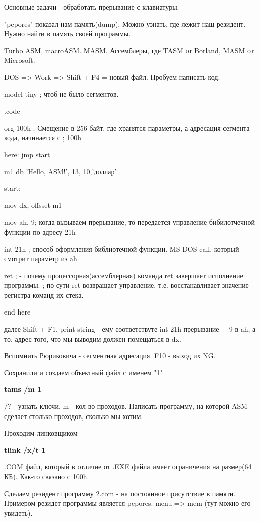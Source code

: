 Основные задачи - обработать прерывание с клавиатуры.   
 
"pepores" показал нам память(dump). Можно узнать, где лежит наш резидент. Нужно найти в память своей программы. 

Turbo ASM, macroASM. MASM. Ассемблеры, где TASM от Borland, MASM от Microsoft. 

DOS => Work => Shift + F4 = новый файл. Пробуем написать код.

model tiny ; чтоб не было сегментов.

.code
\begin{hw} 
org 100h ; Смещение в 256 байт, где хранятся параметры, а адресация сегмента кода, начинается с
		 ; 100h 
\end{hw}
here:
jmp start

m1 db 'Hello, ASM!', 13, 10,'доллар'

start: 

mov dx, offsset m1

mov ah, 9; когда вызываем прерывание, то передается управление бибилотчечной функции по адресу 21h

int 21h ; способ оформления библиотечной функции. MS-DOS call, который смотрит параметр из ah

ret 	; - почему процессорная(ассемблерная) команда ret завершает исполнение программы.
		; по сути ret возвращает управление, т.е. восстанавливает значение регистра команд их стека.

end here    

далее Shift + F1, print string - ему соответствуте int 21h прерывание + 9 в ah, а то, адрес того, что мы выводим должен помещаться в dx.

Вспомнить Рюриковича - сегментная адресация. F10 - выход их NG.

Сохранили и создаем объектный файл с именем "1"

\bfseries tams /m 1 \mdseries

\begin{rem}/? - узнать ключи. m - кол-во проходов. Написать программу, на которой ASM сделает столько проходов, сколько мы хотим.\end{rem} 

Проходим линковщиком

\bfseries tlink /x/t 1 \mdseries

.COM файл, который в отличие от .EXE файла имеет ограничения на размер(64 КБ). Как-то связано с 100h. 

Сделаем резидент программу 2.com - на постоянное присутствие в памяти. Примером резидет-программы является pepores. menu => mem (тут можно его  увидеть).

